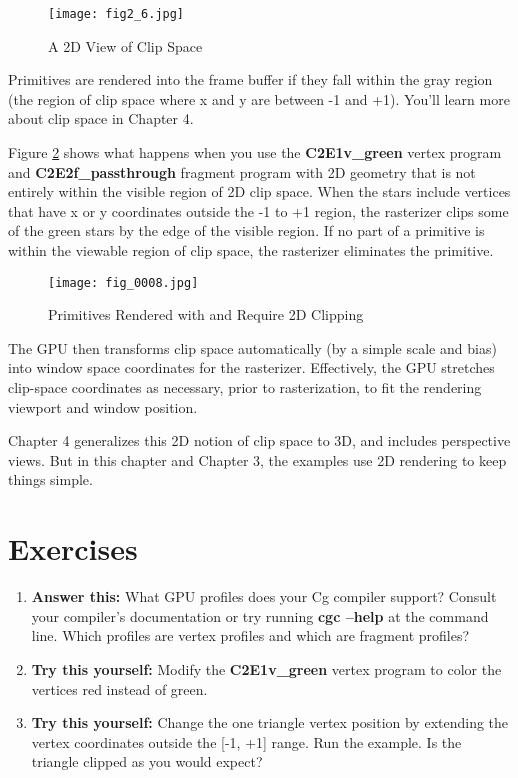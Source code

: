 \documentclass[../main.tex]{subfiles}
\begin{document}
\begin{figure}
    \centering
    \texttt{[image: fig2\_6.jpg]}
    \caption{A 2D View of Clip Space}
    \label{fig:2-6}
\end{figure}

Primitives are rendered into the frame buffer if they fall within the gray region (the region of clip space where x and y are between -1 and +1). You'll learn more about clip space in Chapter 4.

Figure \ref{fig:2-7} shows what happens when you use the \textbf{C2E1v_green} vertex program and \textbf{C2E2f_passthrough} fragment program with 2D geometry that is not entirely within the visible region of 2D clip space. When the stars include vertices that have x or y coordinates outside the -1 to +1 region, the rasterizer clips some of the green stars by the edge of the visible region. If no part of a primitive is within the viewable region of clip space, the rasterizer eliminates the primitive.

\begin{figure}
    \centering
    \texttt{[image: fig\_0008.jpg]}
    \caption{Primitives Rendered with and Require 2D Clipping}
    \label{fig:2-7}
\end{figure}

The GPU then transforms clip space automatically (by a simple scale and bias) into window space coordinates for the rasterizer. Effectively, the GPU stretches clip-space coordinates as necessary, prior to rasterization, to fit the rendering viewport and window position.

Chapter 4 generalizes this 2D notion of clip space to 3D, and includes perspective views. But in this chapter and Chapter 3, the examples use 2D rendering to keep things simple.

\section{Exercises}

\FloatBarrier
\begin{enumerate}
\item \textbf{Answer this:} What GPU profiles does your Cg compiler support? Consult your compiler's documentation or try running \textbf{cgc –help} at the command line. Which profiles are vertex profiles and which are fragment profiles?
\item \textbf{Try this yourself:} Modify the \textbf{C2E1v_green} vertex program to color the vertices red instead of green.
\item \textbf{Try this yourself:} Change the one triangle vertex position by extending the vertex coordinates outside the [-1, +1] range. Run the example. Is the triangle clipped as you would expect?
\end{enumerate}
\FloatBarrier
\end{document}
